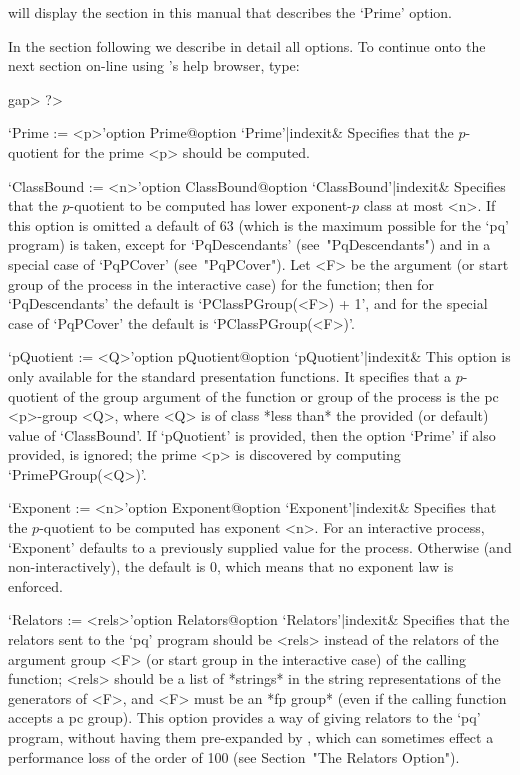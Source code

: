 will display the section  in  this  manual  that  describes  the  `Prime'
option.

In the section following we describe in detail all {\ANUPQ}  options.  To
continue onto the next section on-line using {\GAP}'s help browser, type:

\begintt
gap> ?>
\endtt


\beginitems

\>`Prime := <p>'{option Prime}@{option `Prime'|indexit}&
Specifies that the $p$-quotient for the prime  <p>  should  be  computed.

\>`ClassBound := <n>'{option  ClassBound}@{option  `ClassBound'|indexit}&
Specifies that the $p$-quotient to be  computed  has  lower  exponent-$p$
class at most <n>. If this option is omitted a default of  63  (which  is
the  maximum  possible  for  the  `pq'  program)  is  taken,  except  for
`PqDescendants' (see~"PqDescendants") and in a special case of `PqPCover'
(see~"PqPCover"). Let <F> be the argument (or start group of the  process
in the interactive case) for the function; then for  `PqDescendants'  the
default  is  `PClassPGroup(<F>)  +  1',  and  for  the  special  case  of
`PqPCover' the default is `PClassPGroup(<F>)'.

\>`pQuotient := <Q>'{option pQuotient}@{option `pQuotient'|indexit}&
This option is only available for the standard presentation functions. It
specifies that a $p$-quotient of the group argument of  the  function  or
group of the process is the pc <p>-group  <Q>,  where  <Q>  is  of  class
*less  than*  the  provided  (or  default)  value  of  `ClassBound'.   If
`pQuotient' is provided, then the option  `Prime'  if  also  provided, is
ignored; the prime <p> is discovered by computing `PrimePGroup(<Q>)'.

\>`Exponent := <n>'{option Exponent}@{option `Exponent'|indexit}&
Specifies that the $p$-quotient to be computed has exponent <n>.  For  an
interactive process, `Exponent' defaults to a previously  supplied  value
for the process. Otherwise (and non-interactively),  the  default  is  0,
which means that no exponent law is enforced.

\>`Relators := <rels>'{option Relators}@{option `Relators'|indexit}&
Specifies that the relators sent to the `pq'  program  should  be  <rels>
instead of the relators of the argument group <F> (or start group in  the
interactive case) of the calling function; <rels> should  be  a  list  of
*strings* in the string representations of the generators of <F>, and <F>
must be an *fp group* (even if the calling function accepts a pc  group).
This option provides a way  of  giving  relators  to  the  `pq'  program,
without having them pre-expanded by {\GAP}, which can sometimes effect  a
performance loss of the order of 100 (see Section~"The Relators Option").

